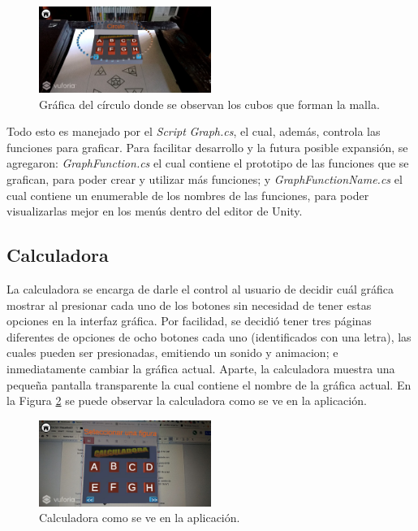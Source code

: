 \begin{figure}[hbt!]
\centering
\includegraphics[width=0.5\textwidth]{figuras/graficas/malla.png}
\caption{\label{fig:graf_malla}Gráfica del círculo donde se observan los cubos que forman la malla.}
\end{figure}

Todo esto es manejado por el \textit{Script} \textit{Graph.cs}, el cual, además, controla las funciones para graficar. Para facilitar desarrollo y la futura posible expansión, se agregaron: \textit{GraphFunction.cs} el cual contiene el prototipo de las funciones que se grafican, para poder crear y utilizar más funciones; y \textit{GraphFunctionName.cs} el cual contiene un enumerable de los nombres de las funciones, para poder visualizarlas mejor en los menús dentro del editor de Unity.
\FloatBarrier

\subsection{Calculadora}
La calculadora se encarga de darle el control al usuario de decidir cuál gráfica mostrar al presionar cada uno de los botones sin necesidad de tener estas opciones en la interfaz gráfica. Por facilidad, se decidió tener tres páginas diferentes de opciones de ocho botones cada uno (identificados con una letra), las cuales pueden ser presionadas, emitiendo un sonido y animacion; e inmediatamente cambiar la gráfica actual. Aparte, la calculadora muestra una pequeña pantalla transparente la cual contiene el nombre de la gráfica actual. En la Figura \ref{fig:graf_calculadora} se puede observar la calculadora como se ve en la aplicación.

\begin{figure}[hbt!]
\centering
\includegraphics[width=0.5\textwidth]{figuras/graficas/calculadora.png}
\caption{\label{fig:graf_calculadora}Calculadora como se ve en la aplicación.}
\end{figure}

